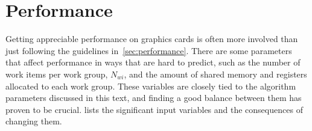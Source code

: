 \documentclass[11pt,twoside]{report}
\begin{document}
\section{Performance\label{sec:results_perf}}
Getting appreciable performance on graphics cards is often more involved than just following the guidelines in~\cref{sec:performance}. There are some parameters that affect performance in ways that are hard to predict, such as the number of work items per work group, $N_{wi}$, and the amount of shared memory and registers allocated to each work group. These variables are closely tied to the algorithm parameters  discussed in this text, and finding a good balance between them has proven to be crucial.  lists the significant input variables and the consequences of changing them.
\begin{table}[htbp]
\caption{Comparison of the parameters of the rectangle and triangle algorithms that affect performance, cf.~\cref{sec:algo}.  \label{tab:params}}

\begin{center}
\end{center}
\end{table}
\end{document}
